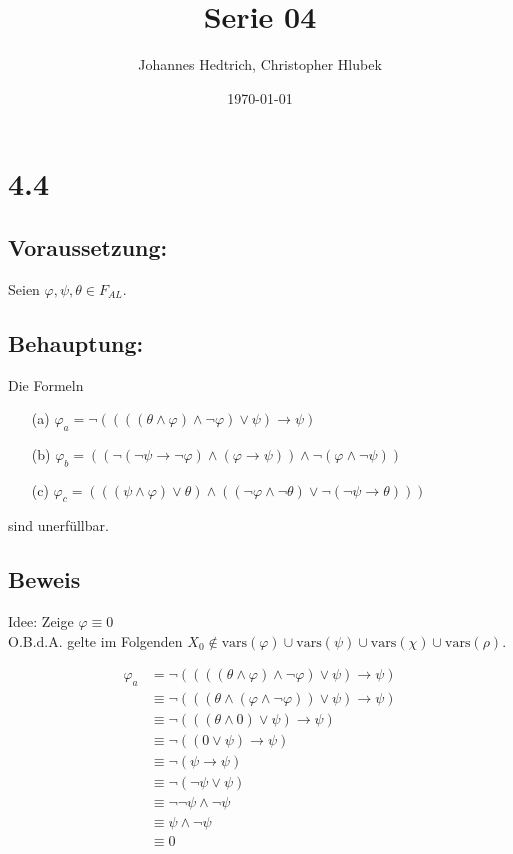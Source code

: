 \documentclass[12pt,a4paper]{scrartcl}
\title{Serie 04}
\author{Johannes Hedtrich, Christopher Hlubek}
\date{\today}
\begin{document}
\section*{4.4}
\subsection*{Voraussetzung:}

Seien $\varphi, \psi, \theta \in F_{AL}$.

\subsection*{Behauptung:}
Die Formeln
\begin{enumerate}
  \item[(a)] $\varphi_a = \neg((((\theta \wedge \varphi) \wedge \neg \varphi) \vee \psi) \rightarrow \psi)$
  \item[(b)] $\varphi_b = ((\neg (\neg \psi \rightarrow \neg \varphi) \wedge (\varphi \rightarrow \psi)) \wedge \neg(\varphi \wedge \neg \psi))$
  \item[(c)] $\varphi_c = (((\psi \wedge \varphi) \vee \theta) \wedge ((\neg \varphi \wedge \neg \theta) \vee \neg(\neg \psi \rightarrow \theta)))$
\end{enumerate}
sind unerfüllbar.

\subsection*{Beweis}

Idee: Zeige $\varphi \equiv 0$\\
O.B.d.A. gelte im Folgenden $X_0 \not\in \textrm{vars}(\varphi) \cup \textrm{vars}(\psi) \cup \textrm{vars}(\chi) \cup \textrm{vars}(\rho)$.

\setcounter{equation}{-1}
\begin{align}
  \varphi_a
    & =\neg((((\theta \wedge \varphi) \wedge \neg \varphi) \vee \psi) \rightarrow \psi) \\
    & \equiv \neg(((\theta \wedge (\varphi \wedge \neg \varphi)) \vee \psi) \rightarrow \psi) \\
    & \equiv \neg(((\theta \wedge 0) \vee \psi) \rightarrow \psi) \\
    & \equiv \neg((0 \vee \psi) \rightarrow \psi) \\
    & \equiv \neg(\psi \rightarrow \psi) \\
    & \equiv \neg(\neg \psi \vee \psi) \\
    & \equiv \neg \neg \psi \wedge \neg \psi \\
    & \equiv \psi \wedge \neg \psi \\
    & \equiv 0
\end{align}
\end{document}
